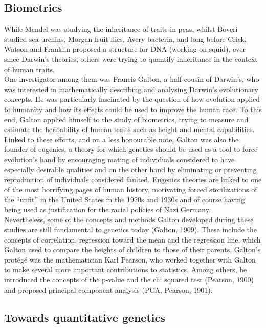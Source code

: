 \subsection{Biometrics} %
While Mendel was studying the inheritance of traits in peas, whilst Boveri studied sea urchins, Morgan fruit flies, Avery bacteria, and long before Crick, Watson and Franklin proposed a structure for DNA (working on squid), ever since Darwin’s theories, others were trying to quantify inheritance in the context of human traits.\\ 

One investigator among them was Francis Galton, a half-cousin of Darwin’s, who was interested in mathematically describing and analysing Darwin’s evolutionary concepts. 
He was particularly fascinated by the question of how evolution applied to humanity and how its effects could be used to improve the human race. 
To this end, Galton applied himself to the study of biometrics, trying to measure and estimate the heritability of human traits such as height and mental capabilities.\\ 

Linked to these efforts, and on a less honourable note, Galton was also the founder of eugenics, a theory for which genetics should be used as a tool to force evolution’s hand by encouraging mating of individuals considered to have especially desirable qualities and on the other hand by eliminating or preventing reproduction of individuals considered faulted. Eugenics theories are linked to one of the most horrifying pages of human history, motivating forced sterilizations of the “unfit” in the United States in the 1920s and 1930s and of course having being used as justification for the racial policies of Nazi Germany.\\ 

Nevertheless, some of the concepts and methods Galton developed during these studies are still fundamental to genetics today (Galton, 1909). 
These include the concepts of correlation, regression toward the mean and the regression line, which Galton used to compare the heights of children to those of their parents. Galton’s protégé was the mathematician Karl Pearson, who worked together with Galton to make several more important contributions to statistics. Among others, he introduced the concepts of the p-value and the chi squared test (Pearson, 1900) and proposed principal component analysis (PCA, Pearson, 1901).

\subsection{Towards quantitative genetics} %

